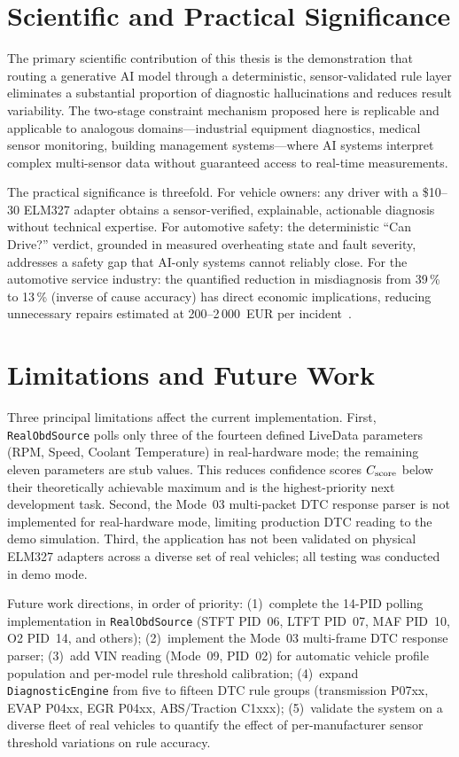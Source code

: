 \section*{Scientific and Practical Significance}

The primary scientific contribution of this thesis is the demonstration that routing a generative AI model through a deterministic, sensor-validated rule layer eliminates a substantial proportion of diagnostic hallucinations and reduces result variability.
The two-stage constraint mechanism proposed here is replicable and applicable to analogous domains---industrial equipment diagnostics, medical sensor monitoring, building management systems---where AI systems interpret complex multi-sensor data without guaranteed access to real-time measurements.

The practical significance is threefold.
For vehicle owners: any driver with a \$10--30 ELM327 adapter obtains a sensor-verified, explainable, actionable diagnosis without technical expertise.
For automotive safety: the deterministic ``Can Drive?'' verdict, grounded in measured overheating state and fault severity, addresses a safety gap that AI-only systems cannot reliably close.
For the automotive service industry: the quantified reduction in misdiagnosis from 39\,\% to 13\,\% (inverse of cause accuracy) has direct economic implications, reducing unnecessary repairs estimated at 200--2\,000~EUR per incident~\cite{cooke2022}.

\section*{Limitations and Future Work}

Three principal limitations affect the current implementation.
First, \texttt{RealObdSource} polls only three of the fourteen defined LiveData parameters (RPM, Speed, Coolant Temperature) in real-hardware mode; the remaining eleven parameters are stub values.
This reduces confidence scores $C_{\mathrm{score}}$ below their theoretically achievable maximum and is the highest-priority next development task.
Second, the Mode~03 multi-packet DTC response parser is not implemented for real-hardware mode, limiting production DTC reading to the demo simulation.
Third, the application has not been validated on physical ELM327 adapters across a diverse set of real vehicles; all testing was conducted in demo mode.

Future work directions, in order of priority:
(1)~complete the 14-PID polling implementation in \texttt{RealObdSource} (STFT PID~06, LTFT PID~07, MAF PID~10, O2 PID~14, and others);
(2)~implement the Mode~03 multi-frame DTC response parser;
(3)~add VIN reading (Mode~09, PID~02) for automatic vehicle profile population and per-model rule threshold calibration;
(4)~expand \texttt{DiagnosticEngine} from five to fifteen DTC rule groups (transmission P07xx, EVAP P04xx, EGR P04xx, ABS/Traction C1xxx);
(5)~validate the system on a diverse fleet of real vehicles to quantify the effect of per-manufacturer sensor threshold variations on rule accuracy.

\clearpage
